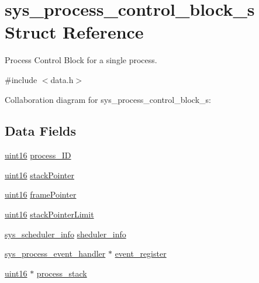 \hypertarget{structsys__process__control__block__s}{}\section{sys\+\_\+process\+\_\+control\+\_\+block\+\_\+s Struct Reference}
\label{structsys__process__control__block__s}


Process Control Block for a single process.  




{\ttfamily \#include $<$data.\+h$>$}



Collaboration diagram for sys\+\_\+process\+\_\+control\+\_\+block\+\_\+s\+:
\subsection*{Data Fields}
\begin{DoxyCompactItemize}
\item 
\hyperlink{definitions_8h_a05f6b0ae8f6a6e135b0e290c25fe0e4e}{uint16} \hyperlink{structsys__process__control__block__s_a3f7ec6be0e16d1ae6b123a9b2bbb7176}{process\+\_\+\+I\+D}
\item 
\hyperlink{definitions_8h_a05f6b0ae8f6a6e135b0e290c25fe0e4e}{uint16} \hyperlink{structsys__process__control__block__s_a524ae2611a8aeb602c9c3ad78f4cae97}{stack\+Pointer}
\item 
\hyperlink{definitions_8h_a05f6b0ae8f6a6e135b0e290c25fe0e4e}{uint16} \hyperlink{structsys__process__control__block__s_aef61433a4fe380bd38c45fe3ea36433c}{frame\+Pointer}
\item 
\hyperlink{definitions_8h_a05f6b0ae8f6a6e135b0e290c25fe0e4e}{uint16} \hyperlink{structsys__process__control__block__s_a6ace28a95ee3d1ae4f0e36aa2675cf51}{stack\+Pointer\+Limit}
\item 
\hyperlink{scheduler_8h_aa491087633867d367d0f0c63f75ac41a}{sys\+\_\+scheduler\+\_\+info} \hyperlink{structsys__process__control__block__s_a0ef282f8acb4718b5a896e3c7d693a4a}{sheduler\+\_\+info}
\item 
\hyperlink{data_8h_a8840f47ed02e5b3b5b9ad35c55057a45}{sys\+\_\+process\+\_\+event\+\_\+handler} $\ast$ \hyperlink{structsys__process__control__block__s_a85bf797910e44aee733a9cc53db76728}{event\+\_\+register}
\item 
\hyperlink{definitions_8h_a05f6b0ae8f6a6e135b0e290c25fe0e4e}{uint16} $\ast$ \hyperlink{structsys__process__control__block__s_a094b1d3add4317d0100c53c8bdc26553}{process\+\_\+stack}
\end{DoxyCompactItemize}



